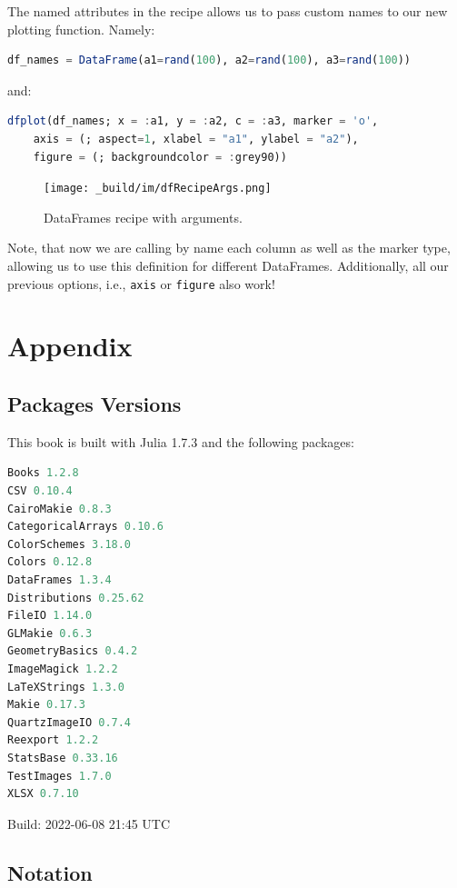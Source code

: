 \documentclass[
  notoc %
]{tufte-book}
\newcommand{\passthrough}[1]{#1}
\begin{document}
The named attributes in the recipe allows us to pass custom names to our
new plotting function. Namely:

\begin{lstlisting}[language=Julia]
df_names = DataFrame(a1=rand(100), a2=rand(100), a3=rand(100))
\end{lstlisting}

and:

\begin{lstlisting}[language=Julia]
dfplot(df_names; x = :a1, y = :a2, c = :a3, marker = 'o',
    axis = (; aspect=1, xlabel = "a1", ylabel = "a2"),
    figure = (; backgroundcolor = :grey90))
\end{lstlisting}

\begin{figure}
\hypertarget{fig:dfRecipeArgs}{%
\centering
\texttt{[image: \_build/im/dfRecipeArgs.png]}
\caption{DataFrames recipe with arguments.}\label{fig:dfRecipeArgs}
}
\end{figure}

Note, that now we are calling by name each column as well as the marker
type, allowing us to use this definition for different DataFrames.
Additionally, all our previous options, i.e.,
\passthrough{\lstinline!axis!} or \passthrough{\lstinline!figure!} also
work!

\hypertarget{sec:appendix}{%
\chapter{Appendix}\label{sec:appendix}}

\hypertarget{sec:appendix_pkg}{%
\section{Packages Versions}\label{sec:appendix_pkg}}

This book is built with Julia 1.7.3 and the following packages:

\begin{lstlisting}[language=Julia]
Books 1.2.8
CSV 0.10.4
CairoMakie 0.8.3
CategoricalArrays 0.10.6
ColorSchemes 3.18.0
Colors 0.12.8
DataFrames 1.3.4
Distributions 0.25.62
FileIO 1.14.0
GLMakie 0.6.3
GeometryBasics 0.4.2
ImageMagick 1.2.2
LaTeXStrings 1.3.0
Makie 0.17.3
QuartzImageIO 0.7.4
Reexport 1.2.2
StatsBase 0.33.16
TestImages 1.7.0
XLSX 0.7.10
\end{lstlisting}

Build: 2022-06-08 21:45 UTC

\hypertarget{sec:notation}{%
\section{Notation}\label{sec:notation}}
\end{document}
